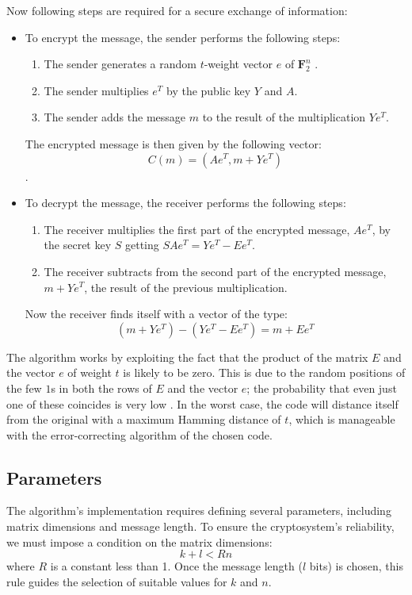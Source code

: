 Now following steps are required for a secure exchange of information:
\begin{itemize}
 \item To encrypt the message,  the sender performs the following steps:
    \begin{enumerate}
     \item The sender generates a random $t$-weight vector $e$ of $\mathbf{F}_2^n$ 
     .
     \item The sender multiplies $e^T$ by the public key $Y$ and $A$.
     \item The sender adds the message $m$ to the result of the multiplication $Ye^T$.
    \end{enumerate}
    The encrypted message is then given by the following vector: $$C(m) = (Ae^T, m+Ye^T)$$.
    \item To decrypt the message, the receiver performs the following steps:
    \begin{enumerate}
     \item The receiver multiplies the first part of the encrypted message, $Ae^T$, by the secret key $S$ getting $SAe^T = Ye^T-Ee^T $.
     \item The receiver subtracts from the second part of the encrypted message, $m+Ye^T$, the result of the previous multiplication.
    \end{enumerate}
    Now the receiver finds itself with a vector of the type: $$(m+Ye^T) - (Ye^T-Ee^T) = m + Ee^T$$
\end{itemize}
The algorithm works by exploiting the fact that the product of the matrix $E$ and the vector $e$ of weight $t$ is likely to be zero. This is due to the random positions of the few $1$s 
in both the rows of $E$ and the vector $e$; the probability that even just one of these coincides is very low .
In the worst case, the code will distance itself from the original with a maximum Hamming distance of $t$, which is manageable with the error-correcting algorithm of the chosen code.

\subsection{Parameters}
The algorithm's implementation requires defining several parameters, including matrix dimensions and message length. To ensure the cryptosystem's reliability, we must impose a condition on the matrix dimensions: $$k + l < Rn$$ where $R$ is a constant less than 1. Once the message length ($l$ bits) is chosen, this rule guides the selection of suitable values for $k$ and $n$.

